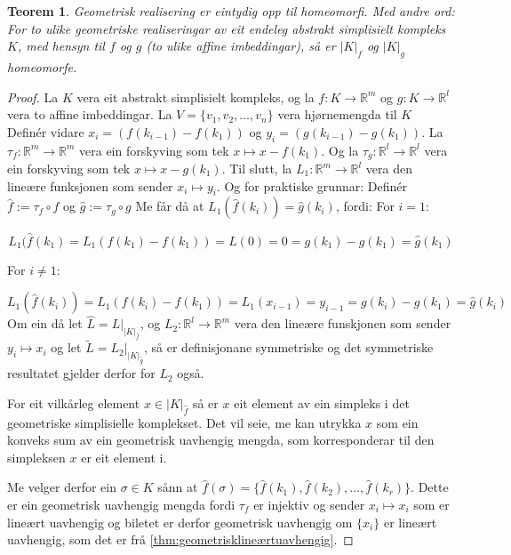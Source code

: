 \documentclass[a4paper, 12pt, norsk]{article}
\theoremstyle{plain}
\newtheorem{theorem}{Teorem}[section]
\theoremstyle{definition}
\newcommand{\Rb}{\mathbb{R}}
\newcommand{\gr}[1]{ \lvert #1 \rvert } %
\begin{document}
\begin{theorem} \label{thm:gr-eintydig}
	Geometrisk realisering er eintydig opp til homeomorfi. Med andre ord: For to ulike geometriske realiseringar av eit endeleg abstrakt simplisielt kompleks $K$, med hensyn til $f$ og $g$ (to ulike affine imbeddingar), så er $\gr{K}_f$ og $\gr{K}_g$ homeomorfe.
\end{theorem}

\begin{proof}%
	La $K$ vera eit abstrakt simplisielt kompleks, og la $f:K\to\Rb^m$ og $g:K\to\Rb^l$ vera to affine imbeddingar. La $V=\{ v_1, v_2, \dots, v_n \}$ vera hjørnemengda til $K$ Definér vidare $x_i=(f(k_{i-1})-f(k_1))$ og $y_i=(g(k_{i-1})-g(k_1))$. La $\tau_f:\Rb^m\to\Rb^m$ vera ein forskyving som tek $x\mapsto x-f(k_1)$. Og la $\tau_g:\Rb^l\to\Rb^l$ vera ein forskyving som tek $x\mapsto x-g(k_1)$. Til slutt, la $L_1:\Rb^m\to\Rb^l$ vera den lineære funksjonen som sender $x_i\mapsto y_i$.
	Og for praktiske grunnar: Definér $\hat{f}:=\tau_f\circ f$ og $\hat{g}:=\tau_g \circ g$
Me får då at $L_1(\hat{f}(k_i))=\hat{g}(k_i)$, fordi:
For $i=1$:

	\begin{equation*}
		L_1(\hat{f}(k_1)=L_1(f(k_1)-f(k_1))=L(0)=0=g(k_1)-g(k_1)=\hat{g}(k_1)
	\end{equation*}

	For $i\neq 1$:

	\begin{equation*}
		L_1(\hat{f}(k_i))=L_1(f(k_i)-f(k_1))=L_1(x_{i-1})=y_{i-1}=g(k_i)-g(k_1)=\hat{g}(k_i)
	\end{equation*}
	Om ein då let $\hat{L}=L|_{\gr{K}_{\hat{f}}}$, og $L_2:\Rb^l\to\Rb^m$ vera den lineære funskjonen som sender $y_i\mapsto x_i$ og let $\tilde{L}=L_2|_{\gr{K}_{\hat{g}}}$, så er definisjonane symmetriske og det symmetriske resultatet gjelder derfor for $L_2$ også.

	For eit vilkårleg element $x\in\gr{K}_{\hat{f}}$ så er $x$ eit element av ein simpleks i det geometriske simplisielle komplekset. Det vil seie, me kan utrykka $x$ som ein konveks sum av ein geometrisk uavhengig mengda, som korresponderar til den simpleksen $x$ er eit element i.
	
	Me velger derfor ein $\sigma\in K$ sånn at $\hat{f}(\sigma)=\{\hat{f}(k_1), \hat{f}(k_2), \dots, \hat{f}(k_r)\}$. Dette er ein geometrisk uavhengig mengda fordi $\tau_f$ er injektiv og sender $x_i\mapsto x_i$ som er lineært uavhengig og biletet er derfor geometrisk uavhengig om $\{x_i\}$ er lineært uavhengig, som det er frå \autoref{thm:geometrisklineærtuavhengig}.
	

\end{proof}
\end{document}
